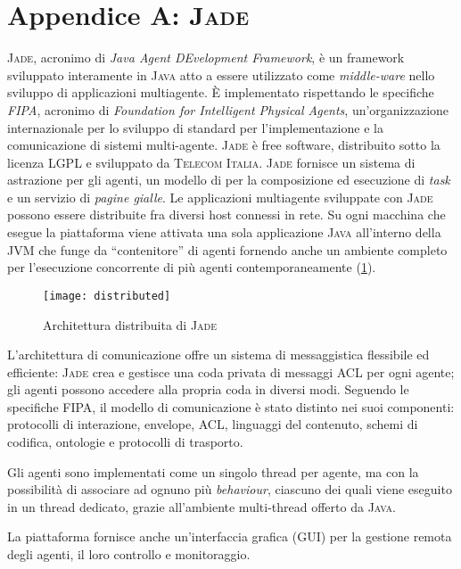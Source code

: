 \chapter*{Appendice A: \textsc{Jade}}

\graphicspath{{Appendix1/figures/}}

\textsc{Jade}, acronimo di \emph{Java Agent DEvelopment Framework}, è un framework sviluppato interamente in \textsc{Java} atto a essere utilizzato come \emph{middle-ware} nello sviluppo di applicazioni multiagente.
È implementato rispettando le specifiche \emph{FIPA}, acronimo di \emph{Foundation for Intelligent Physical Agents}, un'organizzazione internazionale per lo sviluppo di standard per l'implementazione e la comunicazione di sistemi multi-agente.
\textsc{Jade} è free software, distribuito sotto la licenza LGPL e sviluppato da \textsc{Telecom Italia}.
\textsc{Jade} fornisce un sistema di astrazione per gli agenti,  un modello di per la composizione ed esecuzione di \emph{task} e un servizio di \emph{pagine gialle}.
Le applicazioni multiagente sviluppate con \textsc{Jade} possono essere distribuite fra diversi host connessi in rete.
Su ogni macchina che esegue la piattaforma viene attivata una sola applicazione \textsc{Java} all'interno della JVM che funge da ``contenitore'' di agenti fornendo anche un ambiente completo per l'esecuzione concorrente di più agenti contemporaneamente  (\ref{fig:distributed}).

\begin{figure}[!htbp]
  \begin{center}
    \leavevmode
      \texttt{[image: distributed]}
    \caption{Architettura distribuita di \textsc{Jade}}
    \label{fig:distributed}
  \end{center}
\end{figure}

L'architettura di comunicazione offre un sistema di messaggistica flessibile ed efficiente: \textsc{Jade} crea e gestisce una coda privata di messaggi ACL per ogni agente; gli agenti possono accedere alla propria coda in diversi modi.
Seguendo le specifiche FIPA, il modello di comunicazione è stato distinto nei suoi componenti: protocolli di interazione, envelope, ACL, linguaggi del contenuto, schemi di codifica, ontologie e protocolli di trasporto.

Gli agenti sono implementati come un singolo thread per agente, ma con la possibilità di associare ad ognuno più \emph{behaviour}, ciascuno dei quali viene eseguito in un thread dedicato, grazie all'ambiente multi-thread offerto da \textsc{Java}.


La piattaforma fornisce anche un'interfaccia grafica (GUI) per la gestione remota degli agenti, il loro controllo e monitoraggio.

